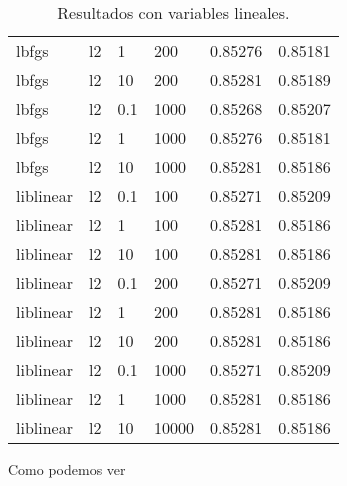 \documentclass[11pt,a4paper]{article}
\begin{document}
\begin{table}[h]
\begin{center}
\begin{tabular}{|l|l|l|l|l|l|}
lbfgs & l2 & 1 & 200 & 0.85276 & 0.85181\\

lbfgs & l2 & 10  &200  & 0.85281 & 0.85189\\

lbfgs & l2 & 0.1 & 1000 & 0.85268 & 0.85207\\

lbfgs & l2 & 1  &1000  & 0.85276 & 0.85181\\

lbfgs & l2 & 10 & 1000 & 0.85281 & 0.85186\\

liblinear & l2 & 0.1 & 100 & 0.85271 & 0.85209\\

liblinear & l2 & 1 & 100 & 0.85281 & 0.85186\\

liblinear & l2 & 10  &100  & 0.85281 & 0.85186\\

liblinear & l2 & 0.1 & 200 & 0.85271 & 0.85209\\

liblinear & l2 & 1  &200  & 0.85281 & 0.85186\\

liblinear & l2 & 10 & 200 & 0.85281 & 0.85186\\

liblinear & l2 & 0.1 & 1000 & 0.85271 & 0.85209\\

liblinear & l2 & 1 & 1000 & 0.85281 & 0.85186\\

liblinear & l2 & 10  &10000 & 0.85281 & 0.85186\\\hline

\end{tabular}
\end{center}
\caption{Resultados con variables lineales.}
	\end{table}

Como podemos ver 



 \newpage
\end{document}
